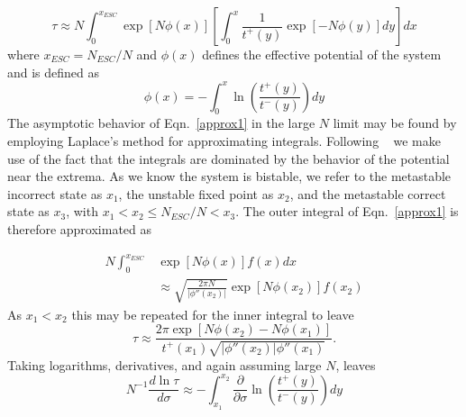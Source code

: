 \documentclass[aps,prl,twocolumn,showpacs,superscriptaddress,groupedaddress]{revtex4}
\begin{document}
\begin{equation}
\tau \approx N \int_{0}^{x_{ESC}} \exp\left[N\phi(x)\right] \left[ \int_{0}^{x} \frac{1}{t^+(y)}\exp\left[-N\phi(y)\right] dy \right] dx
\label{approx1}
\end{equation}
where $x_{ESC} = N_{ESC}/N$ and $\phi(x)$ defines the effective potential of the system and is defined as 
\begin{equation}
\phi(x) =  -\int_{0}^{x} \ln\left(\frac{t^+(y)}{t^-(y)}\right) dy
\label{potential}
\end{equation}
The asymptotic behavior of Eqn.~\ref{approx1} in the large $N$ limit may be found by employing Laplace's method for approximating integrals. Following ~\cite{vankampen} we make use of the fact that the integrals are dominated by the behavior of the potential near the extrema. As we know the system is bistable, we refer to the metastable incorrect state as $x_1$, the unstable fixed point as $x_2$, and the metastable correct state as $x_3$, with $x_1<x_2\le N_{ESC}/N < x_3$. The outer integral of Eqn.~\ref{approx1} is therefore approximated as

\begin{align}
N \int_{0}^{x_{ESC}} &\exp\left[N\phi(x)\right] f(x) dx    \nonumber \\ 
 &\approx \sqrt{\frac{2\pi N}{\vert \phi''(x_2) \vert}}  \exp\left[N\phi(x_2)\right] f(x_2) 
\label{laplace_out}
\end{align}
As $x_1<x_2$ this may be repeated for the inner integral to leave
\begin{equation}
\tau \approx  \frac{2\pi \exp\left[N \phi(x_2)-N \phi(x_1) \right] }{t^+(x_1)\sqrt{\vert \phi''(x_2) \vert \phi''(x_1)}}.
\label{laplace_approx}
\end{equation}
Taking logarithms, derivatives, and again assuming large $N$, leaves
\begin{equation}
N^{-1}  \frac{d \ln \tau}{d \sigma} \approx -\int_{x_1}^{x_2} \frac{\partial}{\partial \sigma}\ln\left(\frac{t^+(y)}{t^-(y)}\right) dy
\label{laplace_approx}
\end{equation}
\end{document}

